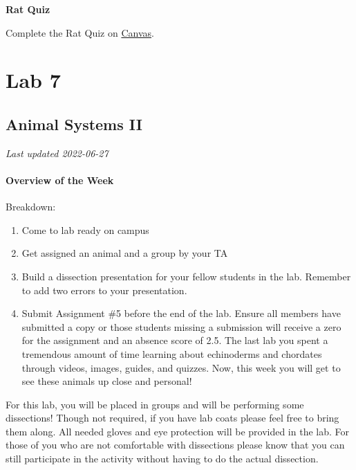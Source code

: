 \documentclass[
]{book}
\providecommand{\tightlist}{%
  \setlength{\itemsep}{0pt}\setlength{\parskip}{0pt}}
\begin{document}
\textbf{Rat Quiz}

Complete the Rat Quiz on \href{https://canvas.ubc.ca/}{Canvas}.

\hypertarget{part-lab-7}{%
\part*{Lab 7}\label{part-lab-7}}

\hypertarget{animal-systems-ii-1}{%
\chapter*{Animal Systems II}\label{animal-systems-ii-1}}

\emph{Last updated 2022-06-27}

\hypertarget{overview-of-the-week-3}{%
\subsection*{Overview of the Week}\label{overview-of-the-week-3}}

Breakdown:

\begin{enumerate}
\def\labelenumi{\arabic{enumi}.}
\tightlist
\item
  Come to lab ready on campus
\item
  Get assigned an animal and a group by your TA
\item
  Build a dissection presentation for your fellow students in the lab. Remember to add two errors to your presentation.
\item
  Submit Assignment \#5 before the end of the lab. Ensure all members have submitted a copy or those students missing a submission will receive a zero for the assignment and an absence score of 2.5.
  The last lab you spent a tremendous amount of time learning about echinoderms and chordates through videos, images, guides, and quizzes. Now, this week you will get to see these animals up close and personal!
\end{enumerate}

For this lab, you will be placed in groups and will be performing some dissections! Though not required, if you have lab coats please feel free to bring them along. All needed gloves and eye protection will be provided in the lab. For those of you who are not comfortable with dissections please know that you can still participate in the activity without having to do the actual dissection.
\end{document}
